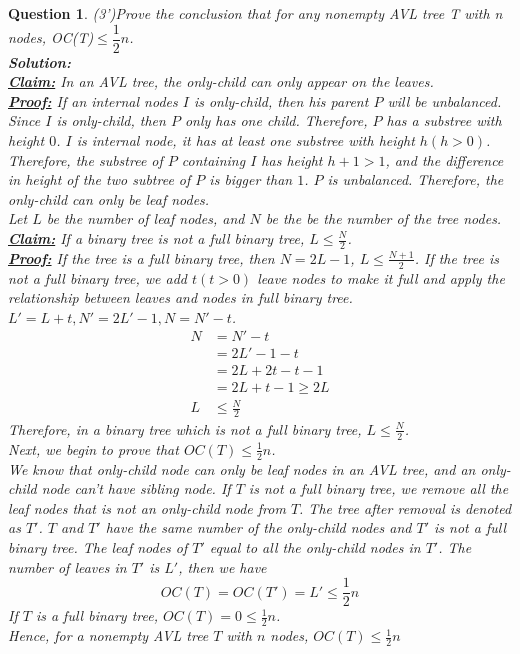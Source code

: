 \documentclass[10.5pt]{article}
\newtheorem{Q}{Question}
\begin{document}
	
	\begin{Q}
		(3')Prove the conclusion that for any nonempty AVL tree T with n nodes, OC(T)$\leq\dfrac{1}{2}n$.\\
		\textbf{Solution:}\\
		\textup{\textbf{\underline{Claim:}} In an AVL tree, the only-child can only appear on the leaves.}\\
		\textup{\textbf{\underline{Proof:}} If an internal nodes $I$ is only-child, then his parent $P$ will be unbalanced. Since $I$ is only-child, then $P$ only has one child. Therefore, $P$ has a substree with height $0$. $I$ is internal node, it has at least one substree with height $h(h > 0)$. Therefore, the substree of $P$ containing $I$ has height $h + 1 > 1$, and the difference in height of the two subtree of $P$ is bigger than $1$. $P$ is unbalanced. Therefore, the only-child can only be leaf nodes.}\\
		\textup{Let $L$ be the number of leaf nodes, and $N$ be the be the number of the tree nodes.}\\
		\textup{\textbf{\underline{Claim:}} If a binary tree is not a full binary tree, $L \le \frac{N}{2}$.}\\
		\textup{\textbf{\underline{Proof:}} If the tree is a full binary tree, then $N = 2L - 1$, $L \le \frac{N + 1}{2}$. If the tree is not a full binary tree, we add $t(t>0)$ leave nodes to make it full and apply the relationship between leaves and nodes in full binary tree. $L' = L + t, N' = 2L' - 1, N = N' - t$. }
		\begin{align*}
			N &= N' - t\\
				&= 2L' - 1 - t\\
				&= 2L + 2t - t - 1\\
				&= 2L + t - 1 \ge 2L\\
			L &\le \frac{N}{2}
		\end{align*}
		\textup{Therefore, in a binary tree which is not a full binary tree, $L \le \frac{N}{2}$.}\\
		\textup{Next, we begin to prove that $OC(T)\le \frac12 n$.}\\
		\textup{We know that only-child node can only be leaf nodes in an AVL tree, and an only-child node can't have sibling node. If $T$ is not a full binary tree, we remove all the leaf nodes that is not an only-child node from $T$. The tree after removal is denoted as $T'$. $T$ and $T'$ have the same number of the only-child nodes and $T'$ is not a full binary tree. The leaf nodes of $T'$ equal to all the only-child nodes in $T'$. The number of  leaves in $T'$ is $L'$, then we have}
		$$
		OC(T) = OC(T') = L' \le \frac12 n
		$$
		\textup{If $T$ is a full binary tree, $OC(T) = 0 \le\frac12n$.}\\
		\textup{Hence, for a nonempty AVL tree $T$ with $n$ nodes, $OC(T)\le\frac12n$}
	\end{Q}
\end{document}
